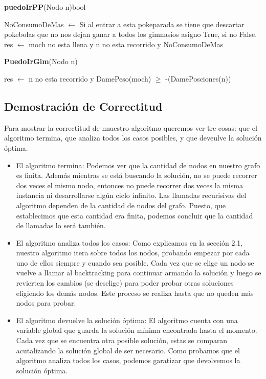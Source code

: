 \documentclass[spanish,12pt]{article}
\begin{document}
\begin{algorithm}[H]{\textbf{puedoIrPP}(Nodo n){bool}}
	\begin{algorithmic}[1]
	\State NoConsumoDeMas $\gets$ Si al entrar a esta pokeparada se tiene que descartar pokebolas que no nos dejan ganar a todos los gimnasios asigno True, si no False.
	\State  res $\gets$  moch no esta llena y n no esta recorrido y NoConsumoDeMas
	\end{algorithmic}
\end{algorithm}

\begin{algorithm}[H]{\textbf{PuedoIrGim}(Nodo n)}
	\begin{algorithmic}[1]
		\state res $\gets$  n no esta recorrido y DamePeso(moch) $\geq$ -(DamePosciones(n))
	\end{algorithmic}
\end{algorithm}

\subsection{Demostración de Correctitud}

Para mostrar la correctitud de nnuestro algoritmo queremos ver tre cosas: que el algoritmo termina, que analiza todos los casos posibles, y que deveulve la solución óptima.

\begin{itemize}
	\item El algoritmo termina:
Podemos ver que la cantidad de nodos en nuestro grafo es finita. Además mientras se está buscando la solución, no se puede recorrer dos veces el mismo nodo, entonces no puede recorrer dos veces la misma instancia ni desarrollarse algún ciclo infinito. Las llamadas recurisivas del algoritmo dependen de la cantidad de nodos del grafo. Puesto, que establecimos que esta cantidad era finita, podemos concluir que la cantidad de llamadas lo será también.
	\item El algoritmo analiza todos los casos:
Como explicamos en la sección 2.1, nuestro algoritmo itera sobre todos los nodos, probando empezar por cada uno de ellos siempre y cuando sea posible. Cada vez que se elige un nodo se vuelve a llamar al backtracking para continuar armando la solución y luego se revierten los cambios (se deselige) para poder probar otras soluciones eligiendo los demás nodos. Este proceso se realiza hasta que no queden más nodos para probar.
	\item El algoritmo devuelve  la solución óptima:
El algoritmo cuenta con una variable global que guarda la solución mínima encontrada hasta el momento. Cada vez que se encuentra otra posible solución, estas se comparan acutalizando la solución global de ser necesario. Como probamos que el algoritmo analiza todos los casos, podemos garatizar que devolvemos la solución óptima.    

\end{itemize}
\end{document}
